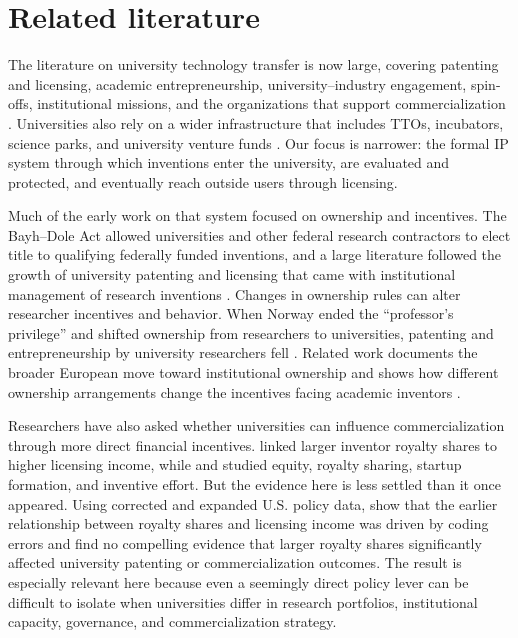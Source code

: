 \section{Related literature}
\label{sec:lit}

The literature on university technology transfer is now large, covering patenting and licensing, academic entrepreneurship, university--industry engagement, spin-offs, institutional missions, and the organizations that support commercialization \citep{CunninghamMenterStarke2025,PerkmannEtAl2013,PerkmannEtAl2021}. Universities also rely on a wider infrastructure that includes TTOs, incubators, science parks, and university venture funds \citep{GoodEtAl2019}. Our focus is narrower: the formal IP system through which inventions enter the university, are evaluated and protected, and eventually reach outside users through licensing.

Much of the early work on that system focused on ownership and incentives. The Bayh--Dole Act allowed universities and other federal research contractors to elect title to qualifying federally funded inventions, and a large literature followed the growth of university patenting and licensing that came with institutional management of research inventions \citep{MoweryEtAl2001,HendersonJaffeTrajtenberg1998,Sampat2006,GrimaldiEtAl2011}. Changes in ownership rules can alter researcher incentives and behavior. When Norway ended the ``professor's privilege'' and shifted ownership from researchers to universities, patenting and entrepreneurship by university researchers fell \citep{HvideJones2018}. Related work documents the broader European move toward institutional ownership and shows how different ownership arrangements change the incentives facing academic inventors \citep{GeunaRossi2011,KenneyPatton2009}.

Researchers have also asked whether universities can influence commercialization through more direct financial incentives. \citet{LachSchankerman2008} linked larger inventor royalty shares to higher licensing income, while \citet{DiGregorioShane2003} and \citet{ArqueCastellsEtAl2016} studied equity, royalty sharing, startup formation, and inventive effort. But the evidence here is less settled than it once appeared. Using corrected and expanded U.S. policy data, \citet{OuelletteTutt2020} show that the earlier relationship between royalty shares and licensing income was driven by coding errors and find no compelling evidence that larger royalty shares significantly affected university patenting or commercialization outcomes. The result is especially relevant here because even a seemingly direct policy lever can be difficult to isolate when universities differ in research portfolios, institutional capacity, governance, and commercialization strategy.

